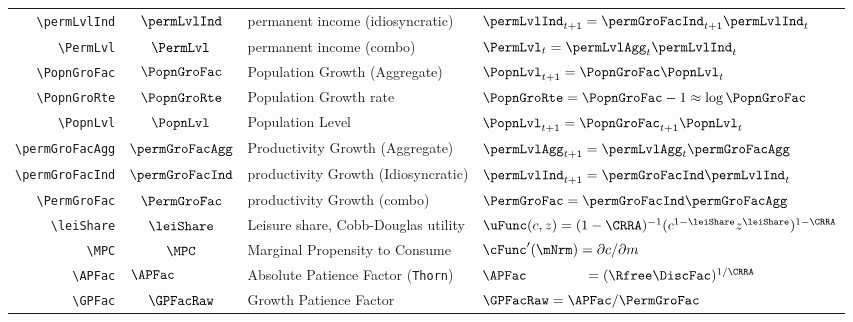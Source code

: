 \documentclass[12pt]{\econtex}
\begin{document}
\begin{table}[ht]
\begin{tabular}{|>{\ttfamily}rcll|}
    \\ \verb|\permLvlInd|  & $\permLvlInd$ & permanent income (idiosyncratic) & $\permLvlInd_{t+1} = \permGroFacInd_{t+1}\permLvlInd_{t} $
    \\ \verb|\PermLvl|  & $\PermLvl$ & permanent income (combo) & $\PermLvl_{t} = \permLvlAgg_{t}\permLvlInd_{t} $
    \\ \verb|\PopnGroFac|   & $\PopnGroFac$ & Population Growth (Aggregate) & $\PopnLvl_{t+1} = \PopnGroFac \PopnLvl_{t}$
    \\ \verb|\PopnGroRte|   & $\PopnGroRte$ & Population Growth rate & $\PopnGroRte = \PopnGroFac - 1 \approx \log \PopnGroFac$
    \\ \verb|\PopnLvl|   & $\PopnLvl$ & Population Level & $\PopnLvl_{t+1} = \PopnGroFac_{t+1} \PopnLvl_{t}$
    \\ \verb|\permGroFacAgg|  & $\permGroFacAgg$ & Productivity Growth (Aggregate) & $\permLvlAgg_{t+1}=\permLvlAgg_{t} \permGroFacAgg$
    \\ \verb|\permGroFacInd|  & $\permGroFacInd$ & productivity Growth (Idiosyncratic) & $\permLvlInd_{t+1} = \permGroFacInd \permLvlInd_{t}$
    \\ \verb|\PermGroFac|  & $\PermGroFac$ & productivity Growth (combo) & $\PermGroFac = \permGroFacInd \permGroFacAgg$
    \\ \verb|\leiShare|  & $\leiShare$ & Leisure share, Cobb-Douglas utility & $\uFunc(c,z)=(1-\CRRA)^{-1}(c^{1-\leiShare}z^{\leiShare})^{1-\CRRA}$
    \\ \verb|\MPC|  & $\MPC$ & Marginal Propensity to Consume & $\cFunc^{\prime}(\mNrm)=\partial c/\partial m$
    \\ \verb|\APFac|  & $\APFac\phantom{_{\PermGroFac}}$ & Absolute Patience Factor (\texttt{Thorn}) & $\APFac\phantom{_{\PermGroFac}} = (\Rfree \DiscFac)^{1/\CRRA} $
    \\ \verb|\GPFac| & $\GPFacRaw$ & Growth Patience Factor & $\GPFacRaw = \APFac/\PermGroFac $

\end{tabular}
\end{table}
\end{document}
